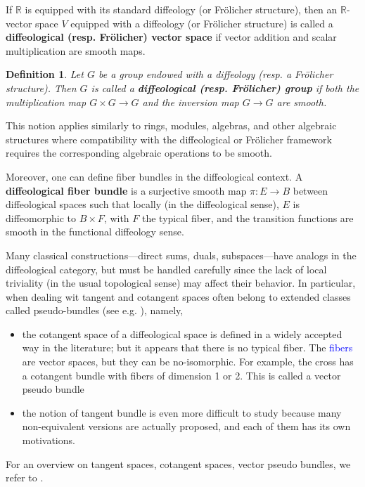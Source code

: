 \documentclass{amsart}
\def\R{\mathbb{R}}
\newcommand{\minor}[1]{\textcolor{blue}{#1}}
\newcounter{thm}
\newcounter{ex}
\newcounter{re}
\newtheorem{Definition}[thm]{Definition}
\begin{document}
If $\R$ is equipped with its standard diffeology (or Fr\"olicher structure), then an $\R$-vector space $V$ equipped with a diffeology (or Fr\"olicher structure) is called a \textbf{diffeological (resp. Fr\"olicher) vector space} if vector addition and scalar multiplication are smooth maps.

\begin{Definition}
	Let $G$ be a group endowed with a diffeology (resp. a Fr\"olicher structure). Then $G$ is called a \textbf{diffeological (resp. Fr\"olicher) group} if both the multiplication map $G \times G \to G$ and the inversion map $G \to G$ are smooth.
\end{Definition}

This notion applies similarly to rings, modules, algebras, and other algebraic structures where compatibility with the diffeological or Fr\"olicher framework requires the corresponding algebraic operations to be smooth.

Moreover, one can define fiber bundles in the diffeological context. A \textbf{diffeological fiber bundle} is a surjective smooth map $\pi: E \to B$ between diffeological spaces such that locally (in the diffeological sense), $E$ is diffeomorphic to $B \times F$, with $F$ the typical fiber, and the transition functions are smooth in the functional diffeology sense.

Many classical constructions—direct sums, duals, subspaces—have analogs in the diffeological category, but must be handled carefully since the lack of local triviality (in the usual topological sense) may affect their behavior. In particular, when dealing wit tangent and cotangent spaces often belong to extended classes called pseudo-bundles (see e.g. \cite{Ma2025-1}), namely, 
\begin{itemize} 
\item the cotangent space of a diffeological space is defined in a widely accepted way in the literature; but it appears that there is no typical fiber. The \minor{fibers} are vector spaces, but they can be no-isomorphic. For example, the cross has a cotangent bundle with fibers of dimension 1 or 2. This is called a vector pseudo bundle
\item the notion of tangent bundle is even more difficult to study because many non-equivalent versions are actually proposed, and each of them has its own motivations. 
\end{itemize}
For an overview on tangent spaces, cotangent spaces, vector pseudo bundles, we refer to \cite{GMW2023}. 
\end{document}
